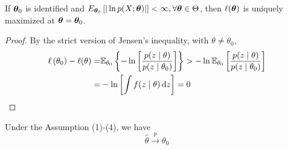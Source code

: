 \begin{lemma}
	If $\boldsymbol{\theta}_{0}$ is identified and $E_{\boldsymbol{\theta}_{0}}\left[|\ln p(X;\boldsymbol{\theta})|\right]<\infty,\forall\boldsymbol{\theta}\in\Theta$, then $\ell(\boldsymbol{\theta})$ is uniquely maximized at $\boldsymbol{\theta}=\boldsymbol{\theta}_{0}$.
\end{lemma}

\begin{proof}
	By the strict version of Jensen's inequality, with $\theta\neq\theta_{0}$,
	\begin{equation*}
		\begin{aligned}
			\ell\left(\theta_{0}\right)-\ell(\theta)= & {\mathbb E}_{\theta_{0}}\left\{-\ln\left[\frac{p(z\mid\theta)}{p(z\mid\theta_{0})}\right]\right\}>-\ln{\mathbb E}_{\theta_{0}}\left[\frac{p(z\mid\theta)}{p(z\mid\theta_{0})}\right] \\
			=                                         & -\ln \left[\int f(z \mid \theta) \mathop{}\!\mathrm{d} z\right]=0
		\end{aligned}
	\end{equation*}
\end{proof}

\begin{theorem}
	Under the Assumption (1)-(4), we have
	\begin{equation}
		\hat{\theta}\stackrel{p}{\rightarrow}\theta_{0}
	\end{equation}
\end{theorem}

